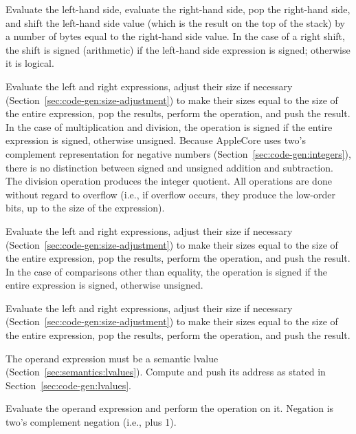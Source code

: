 \documentclass[10pt]{article}
\begin{document}
  Evaluate the left-hand side, evaluate the
right-hand side, pop the right-hand side, and shift the left-hand side
value (which is the result on the top of the stack) by a number of
bytes equal to the right-hand side value.  In the case of a right
shift, the shift is signed (arithmetic) if the left-hand side
expression is signed; otherwise it is logical.

 Evaluate the left and right expressions, adjust their
size if necessary (Section~\ref{sec:code-gen:size-adjustment}) to make
their sizes equal to the size of the entire expression, pop the
results, perform the operation, and push the result.  In the case of
multiplication and division, the operation is signed if the entire
expression is signed, otherwise unsigned.  Because AppleCore uses
two's complement representation for negative numbers
(Section~\ref{sec:code-gen:integers}), there is no distinction between
signed and unsigned addition and subtraction.  The division operation
produces the integer quotient.  All operations are done without regard
to overflow (i.e., if overflow occurs, they produce the low-order
bits, up to the size of the expression).

 Evaluate the left and right expressions, adjust
their size if necessary (Section~\ref{sec:code-gen:size-adjustment})
to make their sizes equal to the size of the entire expression, pop
the results, perform the operation, and push the result.  In the case
of comparisons other than equality, the operation is signed if the
entire expression is signed, otherwise unsigned.

Evaluate the left and right expressions, adjust their size if
necessary (Section~\ref{sec:code-gen:size-adjustment}) to make their
sizes equal to the size of the entire expression, pop the results,
perform the operation, and push the result.

 
The operand expression must be a semantic lvalue
(Section~\ref{sec:semantics:lvalues}).  Compute and push its address
as stated in Section~\ref{sec:code-gen:lvalues}.

Evaluate the operand expression and perform the operation on it.
Negation is two's complement negation (i.e.,  plus 1).
\end{document}
